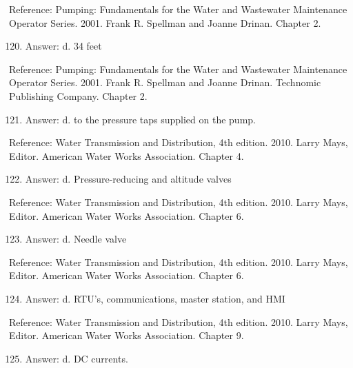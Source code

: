 \documentclass[10pt]{article}
\begin{document}
Reference: Pumping: Fundamentals for the Water and Wastewater Maintenance Operator Series. 2001. Frank R. Spellman and Joanne Drinan. Chapter 2.

\begin{enumerate}
  \setcounter{enumi}{119}
  \item Answer: d. 34 feet
\end{enumerate}

Reference: Pumping: Fundamentals for the Water and Wastewater Maintenance Operator Series. 2001. Frank R. Spellman and Joanne Drinan. Technomic Publishing Company. Chapter 2.

\begin{enumerate}
  \setcounter{enumi}{120}
  \item Answer: d. to the pressure taps supplied on the pump.
\end{enumerate}

Reference: Water Transmission and Distribution, 4th edition. 2010. Larry Mays, Editor. American Water Works Association. Chapter 4.

\begin{enumerate}
  \setcounter{enumi}{121}
  \item Answer: d. Pressure-reducing and altitude valves
\end{enumerate}

Reference: Water Transmission and Distribution, 4th edition. 2010. Larry Mays, Editor. American Water Works Association. Chapter 6.

\begin{enumerate}
  \setcounter{enumi}{122}
  \item Answer: d. Needle valve
\end{enumerate}

Reference: Water Transmission and Distribution, 4th edition. 2010. Larry Mays, Editor. American Water Works Association. Chapter 6.

\begin{enumerate}
  \setcounter{enumi}{123}
  \item Answer: d. RTU's, communications, master station, and HMI
\end{enumerate}

Reference: Water Transmission and Distribution, 4th edition. 2010. Larry Mays, Editor. American Water Works Association. Chapter 9.

\begin{enumerate}
  \setcounter{enumi}{124}
  \item Answer: d. DC currents.
\end{enumerate}
\end{document}
